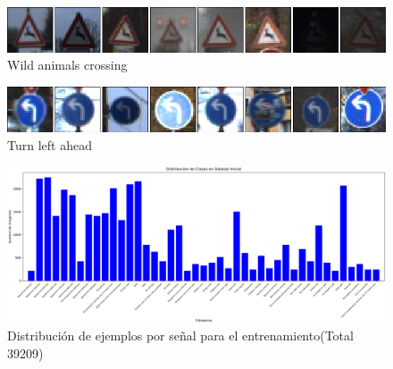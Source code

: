 			\begin{figure}[H]
				\begin{center}
				\includegraphics[width=1\textwidth]{images/desarrollo/imagenes/alemania/1__(32).png}
				\end{center}
				\begin{center}
				\caption{\small{Wild animals crossing}}
				\end{center}
				\vspace{-1.5em}
			\end{figure}

			\begin{figure}[H]
				\begin{center}
				\includegraphics[width=1\textwidth]{images/desarrollo/imagenes/alemania/1__(35).png}
				\end{center}
				\begin{center}
				\caption{\small{Turn left ahead}}
				\end{center}
				\vspace{-1.5em}
			\end{figure}


			\begin{figure}[H]
				\begin{center}
				\includegraphics[width=1\textwidth]{images/desarrollo/histograms/initial39209}
				\end{center}
				\begin{center}
				\caption{\small{Distribución de ejemplos por señal para el entrenamiento(Total 39209)}}
				\vspace{-1em}
			{\small{\fontsize{10}{16.8}\selectfont {Fuente propia}}}
				\end{center}
				\vspace{-1.5em}
			\end{figure}


